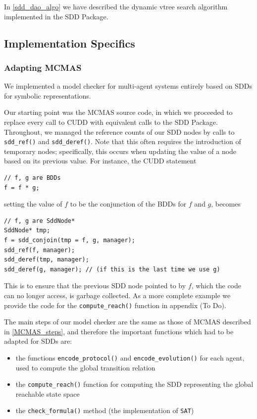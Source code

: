 \documentclass[11pt]{article}
\begin{document}
In \ref{sdd_dao_algo} we have described the dynamic vtree search algorithm implemented in the SDD Package. 



\subsection{Implementation Specifics}

\subsubsection{Adapting MCMAS}

We implemented a model checker for multi-agent systems entirely based on SDDs for symbolic representations. 

Our starting point was the MCMAS source code, in which we proceeded to replace every call to CUDD with equivalent calls to the SDD Package. Throughout, we managed the reference counts of our SDD nodes by calls to \texttt{sdd\_ref()} and 
\texttt{sdd\_deref()}. Note that this often requires the introduction of temporary nodes; specifically, this occurs when updating the value of a node based on its previous value. For instance, the CUDD statement 
\begin{verbatim}
// f, g are BDDs
f = f * g; 
\end{verbatim}
setting the value of $f$ to be the conjunction of the BDDs for $f$ and $g$, becomes
\begin{verbatim}
// f, g are SddNode*
SddNode* tmp;
f = sdd_conjoin(tmp = f, g, manager);
sdd_ref(f, manager);
sdd_deref(tmp, manager);
sdd_deref(g, manager); // (if this is the last time we use g)
\end{verbatim}
This is to ensure that the previous SDD node pointed to by $f$, which the code can no longer access, is garbage collected. As a more complete example we provide the code for the \texttt{compute\_reach()} function in appendix (To Do).

The main steps of our model checker are the same as those of MCMAS described in \ref{MCMAS_steps}, and therefore the important functions which had to be adapted for SDDs are: 
\begin{itemize}
\item the functions \texttt{encode\_protocol()}  and \texttt{encode\_evolution()} for each agent, used to compute the global transition relation
\item the \texttt{compute\_reach()} function for computing the SDD representing the global reachable state space
\item the \texttt{check\_formula()} method (the implementation of \texttt{SAT})
\end{itemize}
\end{document}
